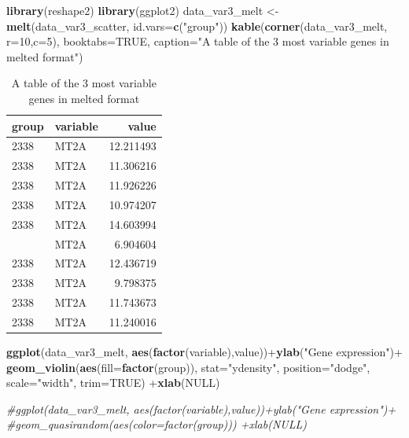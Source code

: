 \documentclass[]{article}
\newenvironment{Shaded}{\begin{snugshade}}{\end{snugshade}}
\newcommand{\KeywordTok}[1]{\textcolor[rgb]{0.13,0.29,0.53}{\textbf{{#1}}}}
\newcommand{\DataTypeTok}[1]{\textcolor[rgb]{0.13,0.29,0.53}{{#1}}}
\newcommand{\DecValTok}[1]{\textcolor[rgb]{0.00,0.00,0.81}{{#1}}}
\newcommand{\StringTok}[1]{\textcolor[rgb]{0.31,0.60,0.02}{{#1}}}
\newcommand{\CommentTok}[1]{\textcolor[rgb]{0.56,0.35,0.01}{\textit{{#1}}}}
\newcommand{\OtherTok}[1]{\textcolor[rgb]{0.56,0.35,0.01}{{#1}}}
\newcommand{\NormalTok}[1]{{#1}}
\numberwithin{figure}{section}
\numberwithin{table}{section}
\theoremstyle{definition}
\theoremstyle{definition}
\theoremstyle{definition}
\theoremstyle{remark}
\begin{document}
\begin{Shaded}
\begin{Highlighting}[]
\KeywordTok{library}\NormalTok{(reshape2)}
\KeywordTok{library}\NormalTok{(ggplot2)}
\NormalTok{data_var3_melt <-}\StringTok{ }\KeywordTok{melt}\NormalTok{(data_var3_scatter, }\DataTypeTok{id.vars=}\KeywordTok{c}\NormalTok{(}\StringTok{"group"}\NormalTok{))}
\KeywordTok{kable}\NormalTok{(}\KeywordTok{corner}\NormalTok{(data_var3_melt, }\DataTypeTok{r=}\DecValTok{10}\NormalTok{,}\DataTypeTok{c=}\DecValTok{5}\NormalTok{), }\DataTypeTok{booktabs=}\OtherTok{TRUE}\NormalTok{, }
        \DataTypeTok{caption=}\StringTok{"A table of the 3 most variable genes in melted format"}\NormalTok{)}
\end{Highlighting}
\end{Shaded}

\begin{table}

\caption{\label{tab:quasimPLot}A table of the 3 most variable genes in melted format}
\centering
\begin{tabular}[t]{llr}
\toprule
group & variable & value\\
\midrule
2338 & MT2A & 12.211493\\
2338 & MT2A & 11.306216\\
2338 & MT2A & 11.926226\\
2338 & MT2A & 10.974207\\
2338 & MT2A & 14.603994\\
\addlinespace
2338 & MT2A & 6.904604\\
2338 & MT2A & 12.436719\\
2338 & MT2A & 9.798375\\
2338 & MT2A & 11.743673\\
2338 & MT2A & 11.240016\\
\bottomrule
\end{tabular}
\end{table}

\begin{Shaded}
\begin{Highlighting}[]
\KeywordTok{ggplot}\NormalTok{(data_var3_melt, }\KeywordTok{aes}\NormalTok{(}\KeywordTok{factor}\NormalTok{(variable),value))+}\KeywordTok{ylab}\NormalTok{(}\StringTok{"Gene expression"}\NormalTok{)+}
\StringTok{    }\KeywordTok{geom_violin}\NormalTok{(}\KeywordTok{aes}\NormalTok{(}\DataTypeTok{fill=}\KeywordTok{factor}\NormalTok{(group)), }\DataTypeTok{stat=}\StringTok{"ydensity"}\NormalTok{, }\DataTypeTok{position=}\StringTok{"dodge"}\NormalTok{,}
            \DataTypeTok{scale=}\StringTok{"width"}\NormalTok{, }\DataTypeTok{trim=}\OtherTok{TRUE}\NormalTok{) +}\KeywordTok{xlab}\NormalTok{(}\OtherTok{NULL}\NormalTok{)}

\CommentTok{#ggplot(data_var3_melt, aes(factor(variable),value))+ylab("Gene expression")+ }
    \CommentTok{#geom_quasirandom(aes(color=factor(group))) +xlab(NULL)}
\end{Highlighting}
\end{Shaded}
\end{document}
